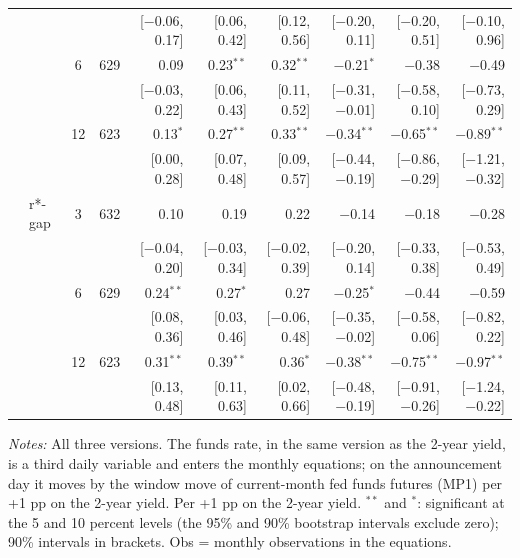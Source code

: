 \begin{longtable}{llcrrrrrrr}
 & & & & {\scriptsize [$-$0.06, 0.17]} & {\scriptsize [0.06, 0.42]} & {\scriptsize [0.12, 0.56]} & {\scriptsize [$-$0.20, 0.11]} & {\scriptsize [$-$0.20, 0.51]} & {\scriptsize [$-$0.10, 0.96]}\\
 &  & 6 & 629 & 0.09 & 0.23$^{**}$ & 0.32$^{**}$ & $-$0.21$^{*}$ & $-$0.38 & $-$0.49\\
 & & & & {\scriptsize [$-$0.03, 0.22]} & {\scriptsize [0.06, 0.43]} & {\scriptsize [0.11, 0.52]} & {\scriptsize [$-$0.31, $-$0.01]} & {\scriptsize [$-$0.58, 0.10]} & {\scriptsize [$-$0.73, 0.29]}\\
 &  & 12 & 623 & 0.13$^{*}$ & 0.27$^{**}$ & 0.33$^{**}$ & $-$0.34$^{**}$ & $-$0.65$^{**}$ & $-$0.89$^{**}$\\
 & & & & {\scriptsize [0.00, 0.28]} & {\scriptsize [0.07, 0.48]} & {\scriptsize [0.09, 0.57]} & {\scriptsize [$-$0.44, $-$0.19]} & {\scriptsize [$-$0.86, $-$0.29]} & {\scriptsize [$-$1.21, $-$0.32]}\\
 & r*-gap & 3 & 632 & 0.10 & 0.19 & 0.22 & $-$0.14 & $-$0.18 & $-$0.28\\
 & & & & {\scriptsize [$-$0.04, 0.20]} & {\scriptsize [$-$0.03, 0.34]} & {\scriptsize [$-$0.02, 0.39]} & {\scriptsize [$-$0.20, 0.14]} & {\scriptsize [$-$0.33, 0.38]} & {\scriptsize [$-$0.53, 0.49]}\\
 &  & 6 & 629 & 0.24$^{**}$ & 0.27$^{*}$ & 0.27 & $-$0.25$^{*}$ & $-$0.44 & $-$0.59\\
 & & & & {\scriptsize [0.08, 0.36]} & {\scriptsize [0.03, 0.46]} & {\scriptsize [$-$0.06, 0.48]} & {\scriptsize [$-$0.35, $-$0.02]} & {\scriptsize [$-$0.58, 0.06]} & {\scriptsize [$-$0.82, 0.22]}\\
 &  & 12 & 623 & 0.31$^{**}$ & 0.39$^{**}$ & 0.36$^{*}$ & $-$0.38$^{**}$ & $-$0.75$^{**}$ & $-$0.97$^{**}$\\
 & & & & {\scriptsize [0.13, 0.48]} & {\scriptsize [0.11, 0.63]} & {\scriptsize [0.02, 0.66]} & {\scriptsize [$-$0.48, $-$0.19]} & {\scriptsize [$-$0.91, $-$0.26]} & {\scriptsize [$-$1.24, $-$0.22]}\\
\end{longtable}
\begin{flushleft}\footnotesize\textit{Notes:} All three versions. The funds rate, in the same version as the 2-year yield, is a third daily variable and enters the monthly equations; on the announcement day it moves by the window move of current-month fed funds futures (MP1) per +1 pp on the 2-year yield. Per +1 pp on the 2-year yield. $^{**}$ and $^{*}$: significant at the 5 and 10 percent levels (the 95\% and 90\% bootstrap intervals exclude zero); 90\% intervals in brackets. Obs = monthly observations in the equations.\end{flushleft}
\endgroup
